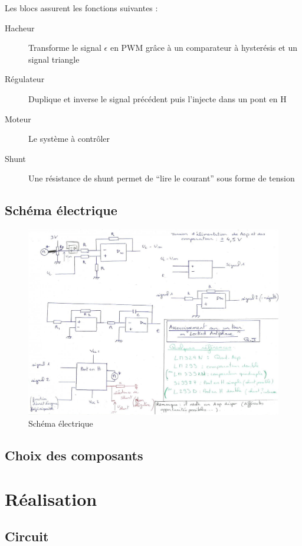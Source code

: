 \documentclass[a4paper]{article}
\begin{document}
Les blocs assurent les fonctions suivantes :
\begin{description}
  \item[Hacheur] 	Transforme le signal $\epsilon$ en PWM grâce à un comparateur à hysterésis et un signal triangle
  \item[Régulateur] Duplique et inverse le signal précédent puis l'injecte dans un pont en H
  \item[Moteur] 	Le système à contrôler
  \item[Shunt] 		Une résistance de shunt permet de “lire le courant” sous forme de tension
\end{description}

\subsection{Schéma électrique}

\begin{figure}[h!]
  \centering
    \includegraphics[width=1\textwidth]{schema}
  \caption{Schéma électrique}
\end{figure}

\subsection{Choix des composants}

\section{Réalisation}

\subsection{Circuit}
\end{document}
